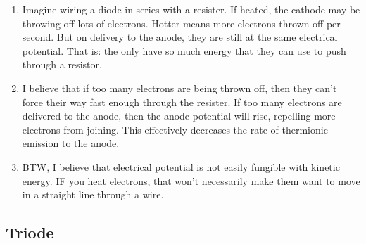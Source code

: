 \documentclass[11pt, oneside]{amsart}
\begin{document}
\begin{enumerate}
  \item Imagine wiring a diode in series with a resister. If heated, the
  cathode may be throwing off lots of electrons. Hotter means more
  electrons thrown off per second. But on delivery to the anode, they
  are still at the same electrical potential. That is: the only have so
  much energy that they can use to push through a resistor.

  \item I believe that if too many electrons are being thrown off, then
  they can't force their way fast enough through the resister. If too
  many electrons are delivered to the anode, then the anode potential
  will rise, repelling more electrons from joining. This effectively
  decreases the rate of thermionic emission to the anode.

  \item BTW, I believe that electrical potential is not easily fungible
  with kinetic energy. IF you heat electrons, that won't necessarily
  make them want to move in a straight line through a wire.
\end{enumerate}

\subsection{Triode}
\end{document}
